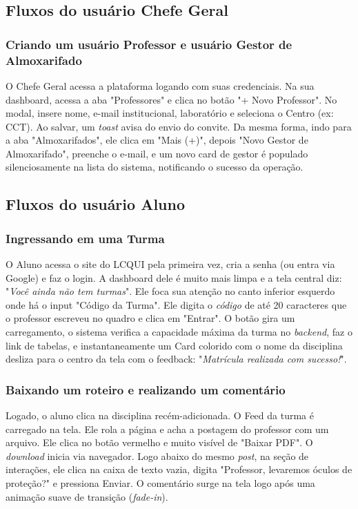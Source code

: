 \subsection{Fluxos do usuário Chefe Geral}

\subsubsection{Criando um usuário Professor e usuário Gestor de Almoxarifado}
O Chefe Geral acessa a plataforma logando com suas credenciais. Na sua dashboard, acessa a aba "Professores" e clica no botão "+ Novo Professor". No modal, insere nome, e-mail institucional, laboratório e seleciona o Centro (ex: CCT). Ao salvar, um \textit{toast} avisa do envio do convite. Da mesma forma, indo para a aba "Almoxarifados", ele clica em "Mais (+)", depois "Novo Gestor de Almoxarifado", preenche o e-mail, e um novo card de gestor é populado silenciosamente na lista do sistema, notificando o sucesso da operação.

\subsection{Fluxos do usuário Aluno}

\subsubsection{Ingressando em uma Turma}
O Aluno acessa o site do LCQUI pela primeira vez, cria a senha (ou entra via Google) e faz o login. A dashboard dele é muito mais limpa e a tela central diz: "\textit{Você ainda não tem turmas}". Ele foca sua atenção no canto inferior esquerdo onde há o input "Código da Turma". Ele digita o \textit{código} de até 20 caracteres que o professor escreveu no quadro e clica em "Entrar". O botão gira um carregamento, o sistema verifica a capacidade máxima da turma no \textit{backend}, faz o link de tabelas, e instantaneamente um Card colorido com o nome da disciplina desliza para o centro da tela com o feedback: "\textit{Matrícula realizada com sucesso!}".

\subsubsection{Baixando um roteiro e realizando um comentário}
Logado, o aluno clica na disciplina recém-adicionada. O Feed da turma é carregado na tela. Ele rola a página e acha a postagem do professor com um arquivo. Ele clica no botão vermelho e muito visível de "Baixar PDF". O \textit{download} inicia via navegador. Logo abaixo do mesmo \textit{post}, na seção de interações, ele clica na caixa de texto vazia, digita "Professor, levaremos óculos de proteção?" e pressiona Enviar. O comentário surge na tela logo após uma animação suave de transição (\textit{fade-in}).

